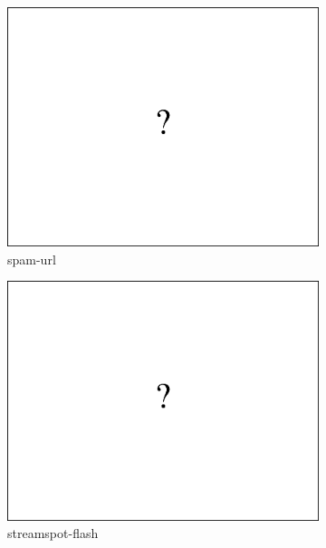 \documentclass[11pt,onecolumn]{article}
\begin{document}
\begin{figure}[ht!]
\begin{subfigure}[t]{0.24\textwidth}
        \centering
        \includegraphics[width=\linewidth]{fig/ap_over_time_placeholder.pdf}
        \caption{spam-url}
    \end{subfigure}
		\hfill
    \begin{subfigure}[t]{0.24\textwidth}
        \centering
        \includegraphics[width=\linewidth]{fig/ap_over_time_placeholder.pdf}
        \caption{streamspot-flash}
    \end{subfigure}\\
    \begin{subfigure}[t]{0.24\textwidth}
        \centering

\end{subfigure}
\end{figure}
\end{document}
